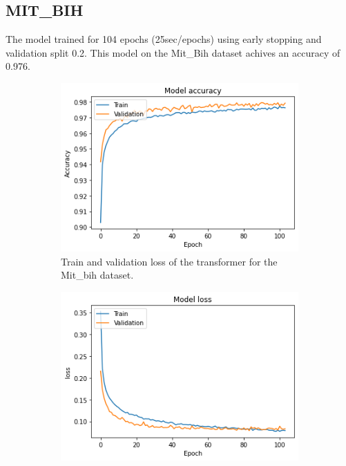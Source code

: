 \documentclass[11pt]{scrartcl}
\begin{document}
\subsection{MIT\_BIH}
The model trained for 104 epochs (25sec/epochs) using early stopping and validation split 0.2.
This model on the Mit\_Bih dataset achives an accuracy of 0.976. 

\begin{figure}[H]
	\centering
	\begin{subfigure}{.30\textwidth}
		\centering
		\includegraphics[width=.95\linewidth]{../models_performance_graphs/mit/transformer_mit_accuracy.png}  
		\caption{Train and validation loss of the transformer for the Mit\_bih dataset.}
	\end{subfigure}
	\begin{subfigure}{.30\textwidth}
		\centering
		\includegraphics[width=.95\linewidth]{../models_performance_graphs/mit/transformer_mit_loss.png}  

\end{subfigure}
\end{figure}
\end{document}
